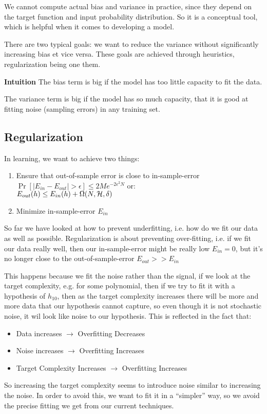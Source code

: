    We cannot compute actual bias and variance in practice, since they depend 
    on the target function and input probability distribution. So it is a 
    conceptual tool, which is helpful when it comes to developing a model.
    
    There are two typical goals: we want to reduce the variance without 
    significantly increasing bias et vice versa. These goals are achieved 
    through heuristics, regularization being one them.
    
    \textbf{Intuition}
    The bias term is big if the model has too little capacity to fit the data.
    
    The variance term is big if the model has so much capacity, that it is good 
    at fitting noise (sampling errors) in any training set.
    
    \subsection{Regularization}
    In learning, we want to achieve two things:
    \begin{enumerate}
        \item Ensure that out-of-sample error is close to in-sample-error \\
        $\Pr\left[|E_{in} - E_{out}| > \epsilon\right] \leq 
        2Me^{-2\epsilon^2N}$ or:\\
        $E_{out}(h)\leq E_{in}(h)+\Omega(N,\mathcal{H},\delta)$ 
        \item Minimize in-sample-error $E_{in}$
    \end{enumerate}
    So far we have looked at how to prevent underfitting, i.e. how do we fit 
    our data as well as possible. Regularization is about preventing 
    over-fitting, i.e. if we fit our data really well, then our in-sample-error 
    might be really low $E_{in}=0$, but it's no longer close to the 
    out-of-sample-error $E_{out}>>E_{in}$
    
    This happens because we fit the noise rather than the signal, if we look at 
    the target complexity, e.g. for some polynomial, then if we try to fit it 
    with a hypothesis of $h_{10}$, then as the target complexity increases 
    there will be more and more data that our hypothesis cannot capture, so 
    even though it is not stochastic noise, it wil look like noise to our 
    hypothesis. This is reflected in the fact that:
    \begin{itemize}
        \item Data increases $\rightarrow$ Overfitting Decreases
        \item Noise increases $\rightarrow$ Overfitting Increases
        \item Target Complexity Increases $\rightarrow$ Overfitting Increases
    \end{itemize}
    So increasing the target complexity seems to introduce noise similar to 
    increasing the noise. In order to avoid this, we want to fit it in a 
    ``simpler'' way, so we avoid the precise fitting we get from our current 
    techniques.
    
